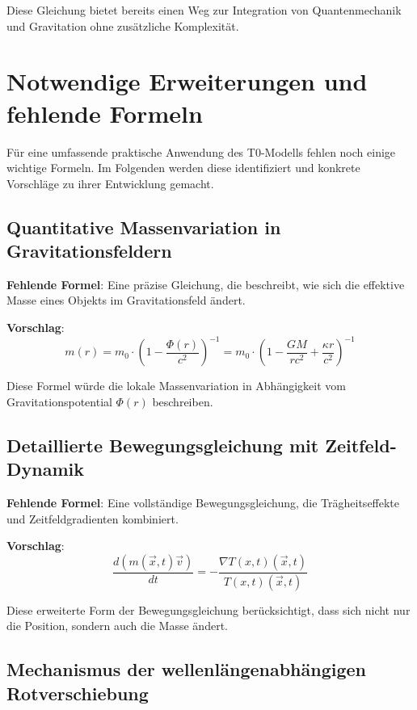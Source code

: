 \documentclass[12pt,a4paper]{article}
\newcommand{\Tfieldt}{T(x,t)}
\newcommand{\vecx}{\vec{x}}
\begin{document}
	Diese Gleichung bietet bereits einen Weg zur Integration von Quantenmechanik und Gravitation ohne zusätzliche Komplexität.
	
	\section{Notwendige Erweiterungen und fehlende Formeln}
	\label{sec:missing_formulas}
	
	Für eine umfassende praktische Anwendung des T0-Modells fehlen noch einige wichtige Formeln. Im Folgenden werden diese identifiziert und konkrete Vorschläge zu ihrer Entwicklung gemacht.
	
	\subsection{Quantitative Massenvariation in Gravitationsfeldern}
	\label{subsec:mass_variation}
	
	\textbf{Fehlende Formel}: Eine präzise Gleichung, die beschreibt, wie sich die effektive Masse eines Objekts im Gravitationsfeld ändert.
	
	\textbf{Vorschlag}:
	\begin{equation}
		m(r) = m_0 \cdot \left(1 - \frac{\Phi(r)}{c^2}\right)^{-1} = m_0 \cdot \left(1 - \frac{GM}{rc^2} + \frac{\kappa r}{c^2}\right)^{-1}
	\end{equation}
	
	Diese Formel würde die lokale Massenvariation in Abhängigkeit vom Gravitationspotential $\Phi(r)$ beschreiben.
	
	\subsection{Detaillierte Bewegungsgleichung mit Zeitfeld-Dynamik}
	\label{subsec:detailed_motion}
	
	\textbf{Fehlende Formel}: Eine vollständige Bewegungsgleichung, die Trägheitseffekte und Zeitfeldgradienten kombiniert.
	
	\textbf{Vorschlag}:
	\begin{equation}
		\frac{d(m(\vecx,t)\vec{v})}{dt} = -\frac{\nabla\Tfieldt(\vecx,t)}{\Tfieldt(\vecx,t)}
	\end{equation}
	
	Diese erweiterte Form der Bewegungsgleichung berücksichtigt, dass sich nicht nur die Position, sondern auch die Masse ändert.
	
	\subsection{Mechanismus der wellenlängenabhängigen Rotverschiebung}
	\label{subsec:wavelength_mechanism}
	
\end{document}
